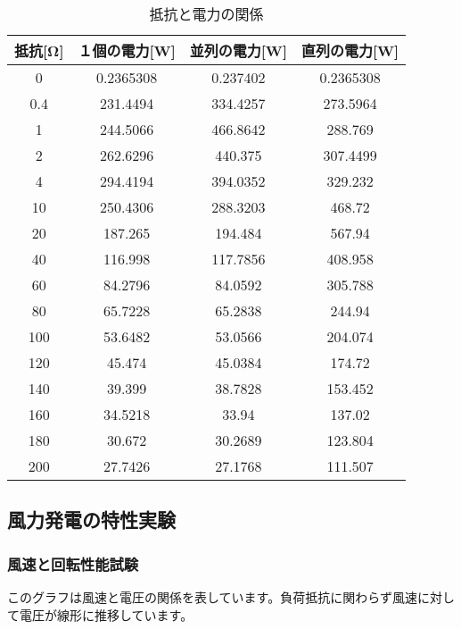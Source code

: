 \documentclass[a4paper,11pt,xelatex,ja=standard]{bxjsarticle}
\begin{document}
            \begin{table}[H]
                \centering
                \caption{抵抗と電力の関係}
                \begin{tabular}{|c|c|c|c|}
                    \hline
                    抵抗[Ω] & １個の電力[W] & 並列の電力[W] & 直列の電力[W] \\
                    \hline
                    0 & 0.2365308 & 0.237402 & 0.2365308 \\
                    0.4 & 231.4494 & 334.4257 & 273.5964 \\
                    1 & 244.5066 & 466.8642 & 288.769 \\
                    2 & 262.6296 & 440.375 & 307.4499 \\
                    4 & 294.4194 & 394.0352 & 329.232 \\
                    10 & 250.4306 & 288.3203 & 468.72 \\
                    20 & 187.265 & 194.484 & 567.94 \\
                    40 & 116.998 & 117.7856 & 408.958 \\
                    60 & 84.2796 & 84.0592 & 305.788 \\
                    80 & 65.7228 & 65.2838 & 244.94 \\
                    100 & 53.6482 & 53.0566 & 204.074 \\
                    120 & 45.474 & 45.0384 & 174.72 \\
                    140 & 39.399 & 38.7828 & 153.452 \\
                    160 & 34.5218 & 33.94 & 137.02 \\
                    180 & 30.672 & 30.2689 & 123.804 \\
                    200 & 27.7426 & 27.1768 & 111.507 \\
                    \hline
                \end{tabular}
            \end{table}
            

    \subsection{風力発電の特性実験}
        \subsubsection{風速と回転性能試験}

            このグラフは風速と電圧の関係を表しています。負荷抵抗に関わらず風速に対して電圧が線形に推移しています。
\end{document}

